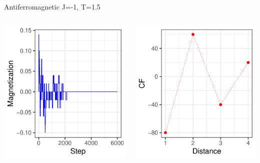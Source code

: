\documentclass{beamer}
\begin{document}
\begin{frame}{Antiferromagnetic J=-1, T=1.5}
\begin{columns}
\begin{column}{0.5\textwidth}
    \begin{center}
     \includegraphics[width=\textwidth]{Pic/J-1_60_2500_T=1.5_Magnetization.pdf}
     \end{center}
\end{column}
\begin{column}{0.5\textwidth}
    \begin{center}
     \includegraphics[width=\textwidth]{Pic/J-1_60_2500_T=1.5_CORRELATION.pdf}

\end{center}
\end{column}
\end{columns}
\end{frame}
\end{document}
